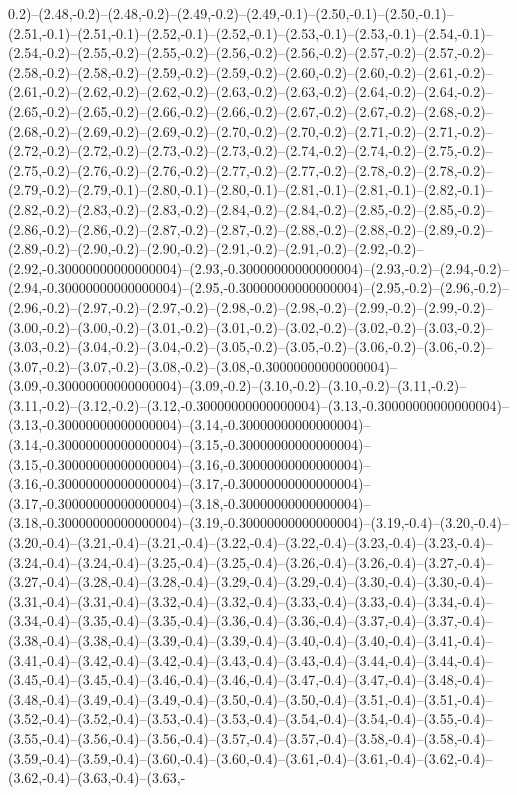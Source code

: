0.2)--(2.48,-0.2)--(2.48,-0.2)--(2.49,-0.2)--(2.49,-0.1)--(2.50,-0.1)--(2.50,-0.1)--(2.51,-0.1)--(2.51,-0.1)--(2.52,-0.1)--(2.52,-0.1)--(2.53,-0.1)--(2.53,-0.1)--(2.54,-0.1)--(2.54,-0.2)--(2.55,-0.2)--(2.55,-0.2)--(2.56,-0.2)--(2.56,-0.2)--(2.57,-0.2)--(2.57,-0.2)--(2.58,-0.2)--(2.58,-0.2)--(2.59,-0.2)--(2.59,-0.2)--(2.60,-0.2)--(2.60,-0.2)--(2.61,-0.2)--(2.61,-0.2)--(2.62,-0.2)--(2.62,-0.2)--(2.63,-0.2)--(2.63,-0.2)--(2.64,-0.2)--(2.64,-0.2)--(2.65,-0.2)--(2.65,-0.2)--(2.66,-0.2)--(2.66,-0.2)--(2.67,-0.2)--(2.67,-0.2)--(2.68,-0.2)--(2.68,-0.2)--(2.69,-0.2)--(2.69,-0.2)--(2.70,-0.2)--(2.70,-0.2)--(2.71,-0.2)--(2.71,-0.2)--(2.72,-0.2)--(2.72,-0.2)--(2.73,-0.2)--(2.73,-0.2)--(2.74,-0.2)--(2.74,-0.2)--(2.75,-0.2)--(2.75,-0.2)--(2.76,-0.2)--(2.76,-0.2)--(2.77,-0.2)--(2.77,-0.2)--(2.78,-0.2)--(2.78,-0.2)--(2.79,-0.2)--(2.79,-0.1)--(2.80,-0.1)--(2.80,-0.1)--(2.81,-0.1)--(2.81,-0.1)--(2.82,-0.1)--(2.82,-0.2)--(2.83,-0.2)--(2.83,-0.2)--(2.84,-0.2)--(2.84,-0.2)--(2.85,-0.2)--(2.85,-0.2)--(2.86,-0.2)--(2.86,-0.2)--(2.87,-0.2)--(2.87,-0.2)--(2.88,-0.2)--(2.88,-0.2)--(2.89,-0.2)--(2.89,-0.2)--(2.90,-0.2)--(2.90,-0.2)--(2.91,-0.2)--(2.91,-0.2)--(2.92,-0.2)--(2.92,-0.30000000000000004)--(2.93,-0.30000000000000004)--(2.93,-0.2)--(2.94,-0.2)--(2.94,-0.30000000000000004)--(2.95,-0.30000000000000004)--(2.95,-0.2)--(2.96,-0.2)--(2.96,-0.2)--(2.97,-0.2)--(2.97,-0.2)--(2.98,-0.2)--(2.98,-0.2)--(2.99,-0.2)--(2.99,-0.2)--(3.00,-0.2)--(3.00,-0.2)--(3.01,-0.2)--(3.01,-0.2)--(3.02,-0.2)--(3.02,-0.2)--(3.03,-0.2)--(3.03,-0.2)--(3.04,-0.2)--(3.04,-0.2)--(3.05,-0.2)--(3.05,-0.2)--(3.06,-0.2)--(3.06,-0.2)--(3.07,-0.2)--(3.07,-0.2)--(3.08,-0.2)--(3.08,-0.30000000000000004)--(3.09,-0.30000000000000004)--(3.09,-0.2)--(3.10,-0.2)--(3.10,-0.2)--(3.11,-0.2)--(3.11,-0.2)--(3.12,-0.2)--(3.12,-0.30000000000000004)--(3.13,-0.30000000000000004)--(3.13,-0.30000000000000004)--(3.14,-0.30000000000000004)--(3.14,-0.30000000000000004)--(3.15,-0.30000000000000004)--(3.15,-0.30000000000000004)--(3.16,-0.30000000000000004)--(3.16,-0.30000000000000004)--(3.17,-0.30000000000000004)--(3.17,-0.30000000000000004)--(3.18,-0.30000000000000004)--(3.18,-0.30000000000000004)--(3.19,-0.30000000000000004)--(3.19,-0.4)--(3.20,-0.4)--(3.20,-0.4)--(3.21,-0.4)--(3.21,-0.4)--(3.22,-0.4)--(3.22,-0.4)--(3.23,-0.4)--(3.23,-0.4)--(3.24,-0.4)--(3.24,-0.4)--(3.25,-0.4)--(3.25,-0.4)--(3.26,-0.4)--(3.26,-0.4)--(3.27,-0.4)--(3.27,-0.4)--(3.28,-0.4)--(3.28,-0.4)--(3.29,-0.4)--(3.29,-0.4)--(3.30,-0.4)--(3.30,-0.4)--(3.31,-0.4)--(3.31,-0.4)--(3.32,-0.4)--(3.32,-0.4)--(3.33,-0.4)--(3.33,-0.4)--(3.34,-0.4)--(3.34,-0.4)--(3.35,-0.4)--(3.35,-0.4)--(3.36,-0.4)--(3.36,-0.4)--(3.37,-0.4)--(3.37,-0.4)--(3.38,-0.4)--(3.38,-0.4)--(3.39,-0.4)--(3.39,-0.4)--(3.40,-0.4)--(3.40,-0.4)--(3.41,-0.4)--(3.41,-0.4)--(3.42,-0.4)--(3.42,-0.4)--(3.43,-0.4)--(3.43,-0.4)--(3.44,-0.4)--(3.44,-0.4)--(3.45,-0.4)--(3.45,-0.4)--(3.46,-0.4)--(3.46,-0.4)--(3.47,-0.4)--(3.47,-0.4)--(3.48,-0.4)--(3.48,-0.4)--(3.49,-0.4)--(3.49,-0.4)--(3.50,-0.4)--(3.50,-0.4)--(3.51,-0.4)--(3.51,-0.4)--(3.52,-0.4)--(3.52,-0.4)--(3.53,-0.4)--(3.53,-0.4)--(3.54,-0.4)--(3.54,-0.4)--(3.55,-0.4)--(3.55,-0.4)--(3.56,-0.4)--(3.56,-0.4)--(3.57,-0.4)--(3.57,-0.4)--(3.58,-0.4)--(3.58,-0.4)--(3.59,-0.4)--(3.59,-0.4)--(3.60,-0.4)--(3.60,-0.4)--(3.61,-0.4)--(3.61,-0.4)--(3.62,-0.4)--(3.62,-0.4)--(3.63,-0.4)--(3.63,-
